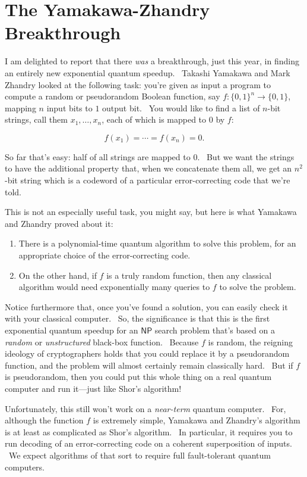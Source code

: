 \documentclass[12pt]{article}
\begin{document}
\section{The Yamakawa-Zhandry Breakthrough}

I am delighted to report that there \emph{was} a breakthrough, just this year, in finding an entirely new exponential quantum speedup. \ Takashi Yamakawa and Mark Zhandry \cite{yz} looked at the following task: you're given as input a program to compute a random or pseudorandom Boolean function, say $f:\{0,1\}^n\rightarrow \{0,1\}$, mapping $n$ input bits to $1$ output bit. \ You would like to find a list of $n$-bit strings, call them $x_1,\ldots,x_n$, each of which is mapped to $0$ by $f$:

$$ f(x_1) = \cdots = f(x_n) = 0.$$

So far that's easy: half of all strings are mapped to $0$. \ But we want the strings to have the additional property that, when we concatenate them all, we get an $n^2$-bit string which is a codeword of a particular error-correcting code that we're told.

This is not an especially useful task, you might say, but here is what Yamakawa and Zhandry proved about it:

\begin{enumerate}
\item There is a polynomial-time quantum algorithm to solve this problem, for an appropriate choice of the error-correcting code.

\item On the other hand, if $f$ is a truly random function, then any classical algorithm would need exponentially many queries to $f$ to solve the problem.
\end{enumerate}

Notice furthermore that, once you've found a solution, you can easily check it with your classical computer. \ So, the significance is that this is the first exponential quantum speedup for an $\mathsf{NP}$ search problem that's based on a \emph{random} or \emph{unstructured} black-box function. \ Because $f$ is random, the reigning ideology of cryptographers holds that you could replace it by a pseudorandom function, and the problem will almost certainly remain classically hard. \ But if $f$ is pseudorandom, then you could put this whole thing on a real quantum computer and run it---just like Shor's algorithm!

Unfortunately, this still won't work on a \emph{near-term} quantum computer. \ For, although the function $f$ is extremely simple, Yamakawa and Zhandry's algorithm is at least as complicated as Shor's algorithm. \ In particular, it requires you to run decoding of an error-correcting code on a coherent superposition of inputs. \ We expect algorithms of that sort to require full fault-tolerant quantum computers.
\end{document}
